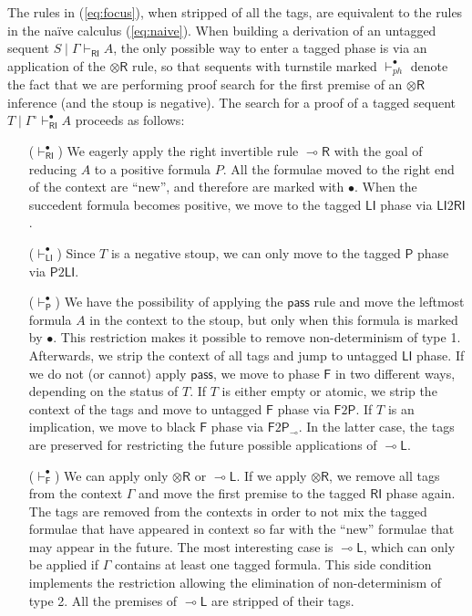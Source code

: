 \documentclass[copyright,creativecommons]{eptcs}
\theoremstyle{definition}
\newcommand{\tl}{\otimes \mathsf{L}}
\newcommand{\tr}{\otimes \mathsf{R}}
\newcommand{\lright}{{\multimap}\mathsf{R}}
\newcommand{\lleft}{{\multimap}\mathsf{L}}
\newcommand{\pass}{\mathsf{pass}}
\newcommand{\unitl}{\mathsf{IL}}
\newcommand{\lolli}{\multimap}
\newcommand{\RI}{\mathsf{RI}}
\newcommand{\LI}{\mathsf{LI}}
\newcommand{\Pass}{\mathsf{P}}
\newcommand{\F}{\mathsf{F}}
\begin{document}
The rules in (\ref{eq:focus}), when stripped of all the tags, are equivalent to the rules in the na{\"i}ve calculus (\ref{eq:naive}). When building a derivation of an untagged sequent $S \mid \Gamma \vdash_\RI A$, the only possible way to enter a tagged phase is via an application of the $\tr$ rule, so that sequents with turnstile marked $\vdash_{ph}^\bullet$ denote the fact that we are performing proof search for the first premise of an $\tr$ inference (and the stoup is negative).
The search for a proof of a tagged sequent $T \mid \Gamma^\circ \vdash^\bullet_\RI A$ proceeds as follows:
\begin{itemize}
\item[($\vdash^\bullet_\RI$)] We eagerly apply the right invertible rule $\lright$ with the goal of reducing $A$ to a positive formula $P$. All the formulae moved to the right end of the context are ``new'', and therefore are marked with $\bullet$.
  When the succedent formula becomes positive, we move to the tagged $\LI$ phase via $\LI2\RI$.
\item[($\vdash^\bullet_\LI$)] Since $T$ is a negative stoup, we can only move to the tagged $\Pass$ phase via $\Pass2\LI$.
\item[($\vdash^\bullet_\Pass$)] We have the possibility of applying the $\pass$ rule and move the leftmost formula $A$ in the context to the stoup, but only when this formula is marked by $\bullet$. This restriction makes it possible to remove non-determinism of type 1. Afterwards, we strip the context of all tags and jump to untagged $\LI$ phase. If we do not (or cannot) apply $\pass$, we move to phase $\F$  in two different ways, depending on the status of $T$. If $T$ is either empty or atomic, we strip the context of the tags and move to untagged $\F$ phase via $\F2\Pass$. If $T$ is an implication, we move to black $\F$ phase via $\F2\Pass_\lolli$. In the latter case, the tags are preserved for restricting the future possible applications of $\lleft$.
\item[($\vdash^\bullet_\F$)] We can apply only $\tr$ or $\lleft$. If we apply $\tr$, we remove all tags from the context $\Gamma$ and move the first premise to the tagged $\RI$ phase again. The tags are removed from the contexts in order to not mix the tagged formulae that have appeared in context so far with the ``new'' formulae that may appear in the future. The most interesting case is $\lleft$, which can only be applied if $\Gamma$ contains at least one tagged formula. This side condition implements the restriction allowing the elimination of non-determinism of type 2. All the premises of $\lleft$ are stripped of their tags.
\end{itemize}
\end{document}
